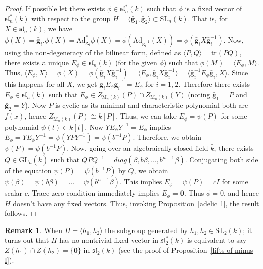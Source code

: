 \documentclass[10pt,twoside]{amsart}
\newcommand{\GL}{\mathrm{GL}}
\newcommand{\SL}{\mathrm{SL}}
\newcommand{\tr}{\mathrm{tr}}
\newcommand{\M}{\mathrm{M}}
\theoremstyle{definition}
\theoremstyle{definition}
\newtheorem{remark}[theorem]{Remark}
\begin{document}
\begin{proof}
If possible let there exists $\phi \in \mathfrak {sl}^*_n(k)$ such that $\phi$ is a fixed vector of $\mathfrak{sl}^*_n(k)$ with respect to the group $H=\langle \mathbf{\bar g}_1, \mathbf{\bar g}_2\rangle\subset \SL_n(k)$. That is, for $X\in \mathfrak{sl}_n(k)$, we have $\phi(X) = \mathbf{\bar g}_i.\phi(X) = \mathrm{Ad}^*_{\mathbf{\bar g}_i}\phi(X) = \phi(\mathrm{Ad}_{\mathbf{\bar g}_i^{-1}}(X)) = \phi(\mathbf{\bar g}_i X \mathbf{\bar g}_i^{-1})$. Now, using the non-degeneracy of the bilinear form, defined as $\langle P, Q\rangle=\tr(PQ)$, there exists a unique $E_{\phi}\in \mathfrak{sl}_n(k)$ (for the given $\phi$) such that $\phi(M)=\langle E_{\phi}, M\rangle$. Thus, $\langle E_{\phi}, X\rangle = \phi(X) = \phi(\mathbf{\bar g}_i X \mathbf{\bar g}_i^{-1}) = \langle E_{\phi}, \mathbf{\bar g}_i X \mathbf{\bar g}_i^{-1}\rangle = \langle \mathbf{\bar g}_i^{-1} E_{\phi} \mathbf{\bar g}_i, X\rangle $. Since this happens for all $X$, we get $\mathbf{\bar g}_i E_{\phi} \mathbf{\bar g}_i^{-1} = E_{\phi}$ for $i=1, 2$. Therefore there exists $E_{\phi} \in \mathfrak{sl}_n(k)$ such that $E_{\phi} \in Z_{\M_n(k)}(P)\cap Z_{\M_n(k)}(Y)$ (noting $\mathbf{\bar g}_1 = P$ and $\mathbf{\bar g}_2 = Y$). Now $P$ is cyclic as its minimal and characteristic polynomial both are $f(x)$, hence $Z_{\M_n(k)}(P)\cong k[P]$. Thus, we can take $E_{\phi} = \psi(P)$ for some polynomial $\psi(t)\in k[t]$. 
Now $YE_{\phi}Y^{-1} = E_{\phi}$ implies $E_{\phi} = YE_{\phi} Y^{-1} = \psi (YPY^{-1}) = \psi(b^{-1}P)$. Therefore, we obtain $\psi(P) = \psi(b^{-1}P)$. Now, going over an algebraically closed field $\bar k$, there exists $Q\in \GL_n(\bar k)$ such that $QPQ^{-1} = diag(\beta, b\beta, \ldots, b^{n-1}\beta)$. Conjugating both side of the equation $\psi(P)=\psi(b^{-1}P)$ by $Q$, we obtain $\psi(\beta) = \psi(b\beta) = \ldots =\psi(b^{n-1}\beta)$. This implies $E_{\phi} =  \psi(P) = cI$ for some scalar $c$. Trace zero condition immediately implies $E_{\phi} = \mathbf{0}$. Thus $\phi=0$, and hence $H$ doesn't have any fixed vectors. Thus, invoking Proposition~\ref{adelic 1}, the result follows.
\end{proof}
\begin{remark}
When $H=\langle h_1,h_2\rangle$ the subgroup generated by $h_1, h_2\in \SL_2(k)$; it turns out that $H$ has no nontrivial fixed vector in $\mathfrak{sl}^*_2(k)$ is equivalent to say $Z(h_1) \cap Z(h_2) = \{\mathbf{0}\}$ in $\mathfrak{sl}_2(k)$ (see the proof of Proposition~\ref{lifts of minus I}).
\end{remark}
\end{document}
